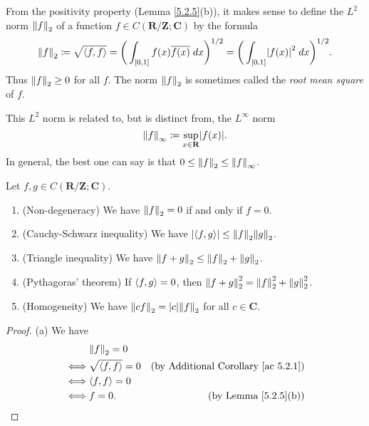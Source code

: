 \begin{additional corollary}\label{ac 5.2.1}
From the positivity property (Lemma \ref{5.2.5}(b)), it makes sense to define the \(L^2\) norm \(\norm*{f}_2\) of a function \(f \in C(\mathbf{R} / \mathbf{Z} ; \mathbf{C})\) by the formula
\[
    \norm*{f}_2 \coloneqq \sqrt{\inner*{f, f}} = \bigg(\int_{[0, 1]} f(x) \overline{f(x)} \; dx\bigg)^{1 / 2} = \bigg(\int_{[0, 1]} \abs*{f(x)}^2 \; dx\bigg)^{1 / 2}.
\]
Thus \(\norm*{f}_2 \geq 0\) for all \(f\).
The norm \(\norm*{f}_2\) is sometimes called the \emph{root mean square} of \(f\).
\end{additional corollary}

\begin{note}
    This \(L^2\) norm is related to, but is distinct from, the \(L^\infty\) norm
    \[
        \norm*{f}_\infty \coloneqq \sup_{x \in \mathbf{R}} \abs*{f(x)}.
    \]
    In general, the best one can say is that \(0 \leq \norm*{f}_2 \leq \norm*{f}_\infty\).
\end{note}

\setcounter{theorem}{6}
\begin{lemma}\label{5.2.7}
    Let \(f, g \in C(\mathbf{R} / \mathbf{Z} ; \mathbf{C})\).
    \begin{enumerate}
        \item (Non-degeneracy)
              We have \(\norm*{f}_2 = 0\) if and only if \(f = 0\).
        \item (Cauchy-Schwarz inequality)
              We have \(\abs*{\inner*{f, g}} \leq \norm*{f}_2 \norm*{g}_2\).
        \item (Triangle inequality)
              We have \(\norm*{f + g}_2 \leq \norm*{f}_2 + \norm*{g}_2\).
        \item (Pythagoras' theorem)
              If \(\inner*{f, g} = 0\), then \(\norm*{f + g}_2^2 = \norm*{f}_2^2 + \norm*{g}_2^2\).
        \item (Homogeneity)
              We have \(\norm*{cf}_2 = \abs*{c} \norm*{f}_2\) for all \(c \in \mathbf{C}\).
    \end{enumerate}
\end{lemma}

\begin{proof}{(a)}
    We have
    \begin{align*}
             & \norm*{f}_2 = 0                                                            \\
        \iff & \sqrt{\inner*{f, f}} = 0 & \text{(by Additional Corollary \ref{ac 5.2.1})} \\
        \iff & \inner*{f, f} = 0                                                          \\
        \iff & f = 0.                   & \text{(by Lemma \ref{5.2.5}(b))}
    \end{align*}
\end{proof}

